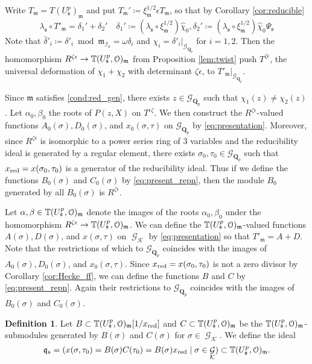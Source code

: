 \documentclass[leqno]{amsart}
\theoremstyle{definition}
\newtheorem{defn}[thm]{Definition}
\theoremstyle{remark}
\newcommand{\eo}{\EuScript{O}}
\newcommand{\Qp}{\mathbf{Q}_p}
\DeclareMathOperator{\Gal}{\mathcal{G}}
\newcommand{\fm}{\mathfrak{m}}
\newcommand{\fq}{\mathfrak{q}}
\newcommand{\fs}{\mathfrak{s}}
\newcommand{\Gp}{\mathcal{G}_{\Qp}} %
\newcommand{\xx}{x_\textnormal{red}}
\newcommand{\K}{{\mathcal{K}}} %
\newcommand{\TT}{\mathbb{T}} %
\newcommand{\I}{\mathcal{I}} %
\begin{document}
Write $T_\fm=T(U^p_\fs)_\fm$ and put
$T_\fm'\coloneqq \xi_\fm^{1/2}\epsilon T_\fm$, so that
by Corollary \ref{cor:reducible}
\[
    \lambda_\fs\circ T'_\fm=
    \delta_1'+\delta_2'\quad
    \delta_1'\coloneqq 
    (\lambda_\fs\circ\xi_\fm^{1/2})\hat{\chi}_0,
    \delta_2'\coloneqq 
    (\lambda_\fs\circ\xi_\fm^{1/2})\hat{\chi}_0\Psi_\fs
\]
Note that $\bar{\delta}'_i\coloneqq\delta'_i\bmod \fm_{\I_\fs}
=\omega\delta_i$ and $\chi_i=\delta'_i\vert_{\Gp}$ for $i=1,2$.
Then the homomorphism 
$R^{\zeta\epsilon}\to \TT(U^p_\fs,\eo)_\fm$
from Proposition \ref{lem:twist}
push $T^{\zeta\epsilon}$, the universal deformation 
of $\chi_1+\chi_2$ with determinant $\zeta\epsilon$,
to $T'_\fm\vert_{\Gp}$.

Since $\fm$ satisfies \eqref{cond:red_gen},
there exists $z\in\Gp$ such that 
${\chi}_1(z)\neq{\chi}_2(z)$.
Let $\alpha_0,\beta_0$ the roots of $P(z,X)$ on $T^{\epsilon\zeta}$.
We then construct the $R^{\zeta\epsilon}$-valued functions
$A_0(\sigma),D_0(\sigma)$, and $x_0(\sigma,\tau)$ 
on $\Gp$ by \eqref{eq:presentation}.
Moreover, since $R^{\zeta\epsilon}$
is isomorphic to a power series ring of 3 variables
and the reducibility ideal is generated by a regular element,
there exists $\sigma_0,\tau_0\in\Gp$ such that
$\xx=x(\sigma_0,\tau_0)$ is a 
generator of the reducibility ideal.
Thus if we define the functions $B_0(\sigma)$ and $C_0(\sigma)$ 
by \eqref{eq:present_repn},
then the module $B_0$ generated by all $B_0(\sigma)$
is $R^{\zeta\epsilon}$.



Let $\alpha,\beta\in \TT(U^p_\fs,\eo)_\fm$
denote the images of the roots $\alpha_0,\beta_0$
under the homomorphism $R^{\zeta\epsilon}\to \TT(U^p_\fs,\eo)_\fm$.
We can define the $\TT(U^p_\fs,\eo)_\fm$-valued functions
$A(\sigma), D(\sigma)$, and $x(\sigma,\tau)$ on $\Gal_\K$
by \eqref{eq:presentation} so that $T'_\fm=A+D$.
Note that the restrictions of which to 
$\Gp$ coincides with the images of 
$A_0(\sigma), D_0(\sigma)$, and $x_0(\sigma,\tau)$.
Since $\xx=x(\sigma_0,\tau_0)$ is not a zero divisor
by Corollary \ref{cor:Hecke_ff}, we can define
the functions $B$ and $C$ by \eqref{eq:present_repn}.
Again their restrictions to $\Gp$ coincides with 
the images of $B_0(\sigma)$ and $C_0(\sigma)$.

\begin{defn}\label{def:fq_ideal}
Let $B\subset\TT(U^p_\fs,\eo)_\fm[1/\xx]$
and $C\subset\TT(U^p_\fs,\eo)_\fm$
be the $\TT(U^p_\fs,\eo)_\fm$-submodules
generated by $B(\sigma)$ and $C(\sigma)$ 
for $\sigma\in\Gal_\K$. We define the ideal
\[
    \fq_\fs=(x(\sigma,\tau_0)=B(\sigma)C(\tau_0)=B(\sigma)\xx
    \mid\sigma\in\Gal_\K)\subset \TT(U^p_\fs,\eo)_\fm.
\]
\end{defn}
\end{document}
